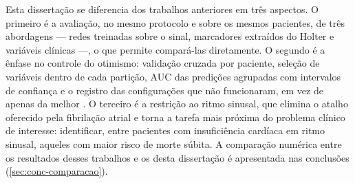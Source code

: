 Esta dissertação se diferencia dos trabalhos anteriores em três aspectos. O
primeiro é a avaliação, no mesmo protocolo e sobre os mesmos pacientes, de
três abordagens --- redes treinadas sobre o sinal, marcadores extraídos do
Holter e variáveis clínicas ---, o que permite compará-las diretamente. O
segundo é a ênfase no controle do otimismo: validação cruzada por paciente,
seleção de variáveis dentro de cada partição, \gls{AUC} das predições
agrupadas com intervalos de confiança e o registro das configurações que
não funcionaram, em vez de apenas da melhor
\cite{kapoor2023leakage}. O terceiro é a restrição ao ritmo sinusal, que
elimina o atalho oferecido pela fibrilação atrial e torna a tarefa mais
próxima do problema clínico de interesse: identificar, entre pacientes com
insuficiência cardíaca em ritmo sinusal, aqueles com maior risco de morte
súbita. A comparação numérica entre os resultados desses trabalhos e os
desta dissertação é apresentada nas conclusões
(\autoref{sec:conc-comparacao}).









